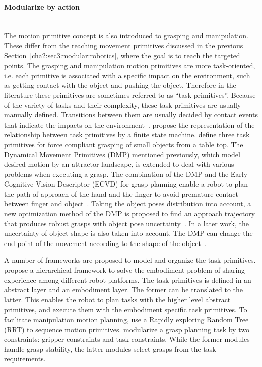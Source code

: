 \paragraph{Modularize by action}
~\\
The motion primitive concept is also introduced to grasping and manipulation. These differ from the reaching movement primitives discussed in the previous Section~\ref{cha2:sec3:modular:robotics}, where the goal is to reach the targeted points. The grasping and manipulation motion primitives are more task-oriented, i.e. each primitive is associated with a specific impact on the environment, such as getting contact with the object and pushing the object. Therefore in the literature these primitives are sometimes referred to as ``task primitives''. Because of the variety of tasks and their complexity, these task primitives are usually manually defined. Transitions between them are usually decided by contact events that indicate the impacts on the environment~\citep{morrow1997manipulation}. \citet{michelman1994forming} propose the representation of the relationship between task primitives by a finite state machine. \citet{kazemi2012robust} define three task primitives for force compliant grasping of small objects from a table top. The Dynamical Movement Primitives (DMP) mentioned previously, which model desired motion by an attractor landscape, is extended to deal with various problems when executing a grasp. The combination of the DMP and the Early Cognitive Vision Descriptor (ECVD) for grasp planning enable a robot to plan the path of  approach of the hand and the finger to avoid premature contact between finger and object~\citep{kroemer2011grasping}. Taking the object poses distribution into account, a new optimization method of the DMP is proposed to find an approach trajectory that produces robust grasps with object pose uncertainty~\citep{stulp2011learning}. In a later work, the uncertainty of object shape is also taken into account. The DMP can change the end point of the movement according to the shape of the object~\citep{stulp2012reinforcement}.

A number of frameworks are proposed to model and organize the task primitives. \citet{laaksonen2010embodiment,felip2013manipulation} propose a hierarchical framework to solve the embodiment problem of sharing experience among different robot platforms. The task primitives is defined in an abstract layer and an embodiment layer.
The former can be translated to the latter. This enables the robot to plan tasks with the higher level abstract primitives, and execute them with the embodiment specific task primitives. To facilitate manipulation motion planning, \citet{barry2013manipulation} use a Rapidly exploring Random Tree (RRT) to sequence motion primitives. \citet{detry2013generalizing} modularize a grasp planning task by two constraints: gripper constraints and task constraints. While the former modules handle grasp stability, the latter modules select grasps from the task requirements.

